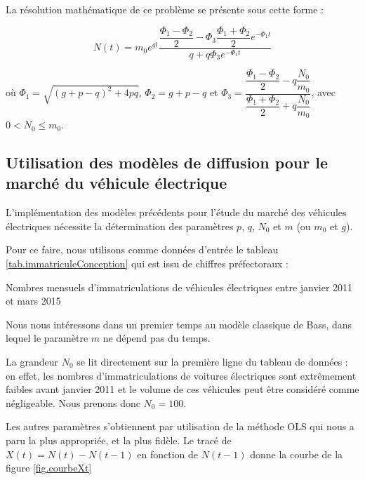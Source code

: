 		
		La résolution mathématique de ce problème se présente sous cette forme :
		
			\[
				N(t) = m_0 e^{gt} \dfrac{\dfrac{\Phi_1 - \Phi_2}{2} - \Phi_3 \dfrac{\Phi_1 + \Phi_2}{2} e^{-\Phi_1 t}}{q + q \Phi_3 e^{-\Phi_1 t}}
			\]
			
		où $\Phi_1 = \sqrt{(g+p-q)^2 + 4pq}$, $\Phi_2 = g + p - q$ et $\Phi_3 = \dfrac{\dfrac{\Phi_1 - \Phi_2}{2} - q \dfrac{N_0}{m_0}}{\dfrac{\Phi_1 + \Phi_2}{2} + q \dfrac{N_0}{m_0}}$, avec $0 < N_0 \leqslant m_0$.


	\subsection{Utilisation des modèles de diffusion pour le marché du véhicule électrique}

		L'implémentation des modèles précédents pour l'étude du marché des véhicules électriques nécessite la détermination des paramètres $p$, $q$, $N_0$ et $m$ (ou $m_0$ et $g$).

		Pour ce faire, nous utilisons comme données d'entrée le tableau \ref{tab.immatriculeConception} qui est issu de chiffres préfectoraux :
	
		\begin{table}[h!]
			\caption{Nombres mensuels d'immatriculations de véhicules électriques entre janvier 2011 et mars 2015 \label{tab.immatriculeConception}}
			\begin{center}
			
			\end{center}
		\end{table}


		Nous nous intéressons dans un premier temps au modèle classique de Bass, dans lequel le paramètre $m$ ne dépend pas du temps.

		La grandeur $N_0$ se lit directement sur la première ligne du tableau de données : en effet, les nombres d'immatriculations de voitures électriques sont extrêmement faibles avant janvier 2011 et le volume de ces véhicules peut être considéré comme négligeable. Nous prenons donc $N_0 = 100$.

		Les autres paramètres s'obtiennent par utilisation de la méthode OLS qui nous a paru la plus appropriée, et la plus fidèle. Le tracé de $X(t) = N(t) - N(t-1)$ en fonction de $N(t-1)$ donne la courbe de la figure \ref{fig.courbeXt}
		
